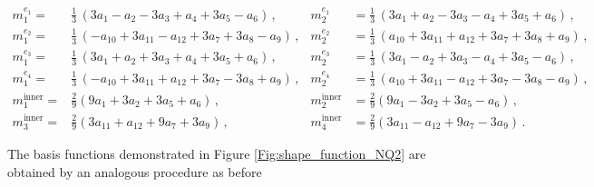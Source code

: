 \begin{equation}
 \begin{aligned}
  m^{e_1}_{1} =& \frac{1}{3} \, (3a_1 - a_2 - 3a_3 + a_4 + 3a_5 - a_6) \,,  &m^{e_1}_{2} &= \frac{1}{3}  \, (3a_1 + a_2 - 3a_3 - a_4 + 3a_5 + a_6)\,, 
  \\  m^{e_2}_{1} =& \frac{1}{3}  \, (-a_{10} +3a_{11} - a_{12} + 3a_7 + 3a_8 - a_9) \,,   &m^{e_2}_{2} &= \frac{1}{3}  \, (a_{10} +3a_{11} + a_{12} + 3a_7 + 3a_8 + a_9) \,, 
  \\  m^{e_3}_{1} =& \frac{1}{3}  \,(3a_1 + a_2 + 3a_3 + a_4 + 3a_5 + a_6) \,,  &m^{e_3}_{2} &= \frac{1}{3} \,(3a_1 - a_2 + 3a_3 - a_4 + 3a_5 - a_6) \,, 
  \\  m^{e_4}_{1} =& \frac{1}{3} \,( -a_{10} + 3a_{11} + a_{12} + 3a_7 - 3a_8 + a_9) \,,  &m^{e_4}_{2} &= \frac{1}{3} \,( a_{10} + 3a_{11} - a_{12} + 3a_7 - 3a_8 - a_9) \,, 
  \\  m^\textrm{inner}_1 =& \frac{2}{9} (9 a_1 + 3 a_2 + 3 a_5 + a_6) \,, &m^\textrm{inner}_2 &= \frac{2}{9} (9 a_1 - 3 a_2 + 3 a_5 - a_6) \,, 
  \\ m^\textrm{inner}_3 =& \frac{2}{9} (3 a_{11} + a_{12} + 9 a_7 + 3 a_9) \,, &m^\textrm{inner}_4 &= \frac{2}{9} (3 a_{11} - a_{12} + 9 a_7 - 3 a_9) \,.
 \end{aligned}
\end{equation} 


The  basis functions demonstrated in Figure  \ref{Fig:shape_function_NQ2}  are obtained by an analogous procedure as before

